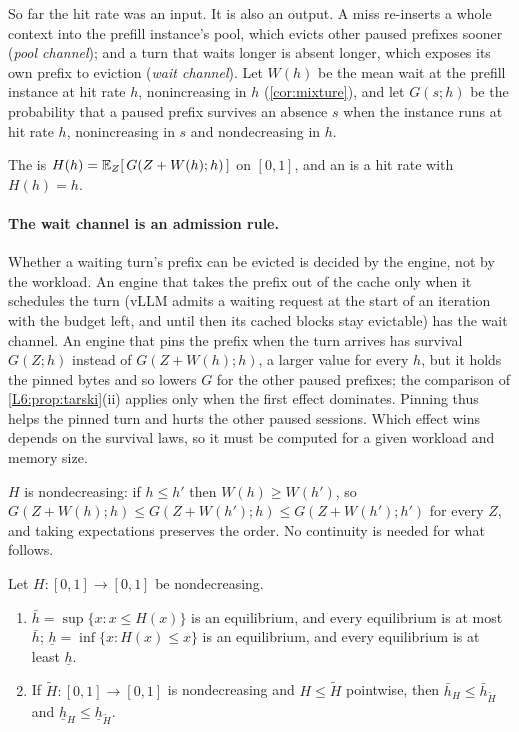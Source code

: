 So far the hit rate was an input. It is also an output. A miss re-inserts a whole
context into the prefill instance's pool, which evicts other paused prefixes sooner
(\emph{pool channel}); and a turn that waits longer is absent longer, which exposes its
own prefix to eviction (\emph{wait channel}). Let $W(h)$ be the mean wait at the prefill
instance at hit rate $h$, nonincreasing in $h$ (\cref{cor:mixture}), and let $G(s;h)$ be
the probability that a paused prefix survives an absence $s$ when the instance runs at
hit rate $h$, nonincreasing in $s$ and nondecreasing in $h$.

\begin{definition}\label{L6:def:feedback}
The  is $H(h)=\mathbb{E}_Z[\,G(Z+W(h);h)\,]$ on $[0,1]$, and an
 is a hit rate with $H(h)=h$.
\end{definition}

\paragraph{The wait channel is an admission rule.} Whether a waiting turn's prefix
can be evicted is decided by the engine, not by the workload. An engine that
takes the prefix out of the cache only when it schedules the turn (vLLM admits a
waiting request at the start of an iteration with the budget left, and until then
its cached blocks stay evictable) has the wait channel. An engine that pins the
prefix when the turn arrives has survival $G(Z;h)$ instead of $G(Z+W(h);h)$, a larger
value for every $h$, but it holds the pinned bytes and so lowers $G$ for the other
paused prefixes; the comparison of \cref{L6:prop:tarski}(ii) applies only when the
first effect dominates. Pinning thus helps the pinned turn and hurts the other paused
sessions. Which effect wins depends on the survival laws, so it must be computed for a
given workload and memory size.

$H$ is nondecreasing: if $h\le h'$ then $W(h)\ge W(h')$, so
$G(Z+W(h);h)\le G(Z+W(h');h)\le G(Z+W(h');h')$ for every $Z$, and taking expectations
preserves the order. No continuity is needed for what follows.

\begin{proposition}\label{L6:prop:tarski}
Let $H:[0,1]\to[0,1]$ be nondecreasing.
\begin{enumerate}[label=(\roman*)]
\item $\bar h=\sup\{x:x\le H(x)\}$ is an equilibrium, and every equilibrium is at most
  $\bar h$; $\underline h=\inf\{x:H(x)\le x\}$ is an equilibrium, and every
  equilibrium is at least $\underline h$.
\item If $\tilde H:[0,1]\to[0,1]$ is nondecreasing and $H\le\tilde H$ pointwise, then
  $\bar h_H\le\bar h_{\tilde H}$ and $\underline h_H\le\underline h_{\tilde H}$.
\end{enumerate}
\end{proposition}

